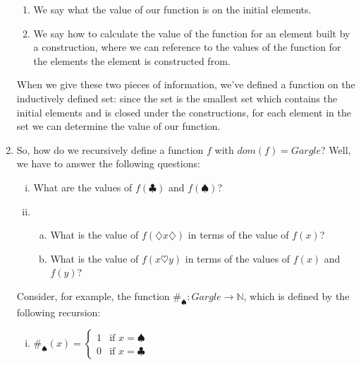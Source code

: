 \begin{enumerate}[{\thesection}.1]
		\begin{enumerate}[1.]
		
			\item We say what the value of our function is on the initial elements.
			
			\item We say how to calculate the value of the function for an element built by a construction, where we can reference to the values of the function for the elements the element is constructed from.
		
		\end{enumerate}

		When we give these two pieces of information, we've defined a function on the inductively defined set: since the set is the smallest set which contains the initial elements and is closed under the constructions, for each element in the set we can determine the value of our function.

		\item So, how do we recursively define a function $f$ with $dom(f)=Gargle$? Well, we have to answer the following questions:
		\begin{enumerate}[(i)]
		
			\item What are the values of $ f(\clubsuit)$ and $f(\spadesuit)$?
			
			\item \begin{enumerate}[(a)]
					
					\item  What is the value of $f(\diamondsuit x\diamondsuit)$ in terms of the value of $f(x)$?

					\item What is the value of $f(x\heartsuit y)$ in terms of the values of $f(x)$ and $f(y)$?
					
		\end{enumerate}
		
		\end{enumerate}
		
	Consider, for example, the function $\#_\spadesuit:Gargle\to\mathbb{N}$, which is defined by the following recursion:
		
	\begin{enumerate}[(i)]
		
			\item $\#_\spadesuit(x)=\begin{cases} 1 & \text{if }x=\spadesuit
			\\0 &\text{if }x=\clubsuit\end{cases}$
			

\end{enumerate}
\end{enumerate}
